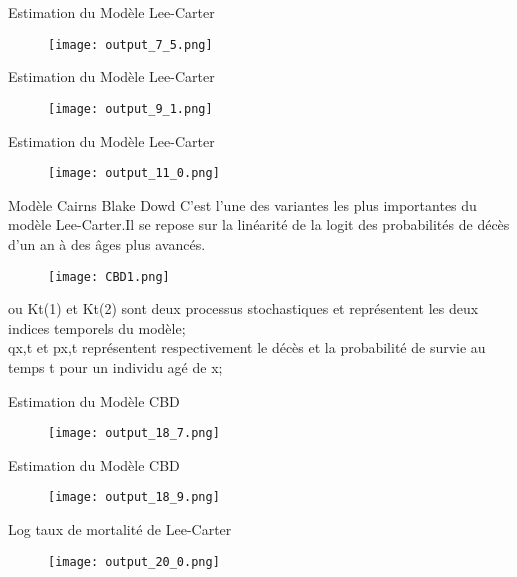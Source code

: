 \documentclass[11pt]{beamer}
\begin{document}
\begin{frame}{Estimation du Modèle Lee-Carter}
\begin{figure}[!htb]
    \centering
    \texttt{[image: output\_7\_5.png]}
\end{figure}
\end{frame}

\begin{frame}{Estimation du Modèle Lee-Carter}
\begin{figure}[!htb]
    \centering
    \texttt{[image: output\_9\_1.png]}
\end{figure}
\end{frame}

\begin{frame}{Estimation du Modèle Lee-Carter}
\begin{figure}[!htb]
    \centering
    \texttt{[image: output\_11\_0.png]}
\end{figure}
\end{frame}

\begin{frame}{Modèle Cairns Blake Dowd}
C'est l’une des variantes les plus importantes du modèle Lee-Carter.Il se repose sur la linéarité de la logit des probabilités de décès d’un an à des âges plus avancés.
\begin{figure}[!htb]
    \centering
    \texttt{[image: CBD1.png]}
\end{figure}
ou Kt(1) et Kt(2) sont deux processus stochastiques et représentent les deux indices temporels du modèle;
\\qx,t et px,t représentent respectivement le décès et la probabilité de survie au temps t pour un individu agé de x;
\end{frame}

\begin{frame}{Estimation du Modèle CBD}
\begin{figure}[!htb]
    \centering
    \texttt{[image: output\_18\_7.png]}
\end{figure}
\end{frame}

\begin{frame}{Estimation du Modèle CBD}
\begin{figure}[!htb]
    \centering
    \texttt{[image: output\_18\_9.png]}
\end{figure}
\end{frame}

\begin{frame}{Log taux de mortalité de Lee-Carter }
\begin{figure}[!htb]
    \centering
    \texttt{[image: output\_20\_0.png]}
\end{figure}
\end{frame}
\end{document}
